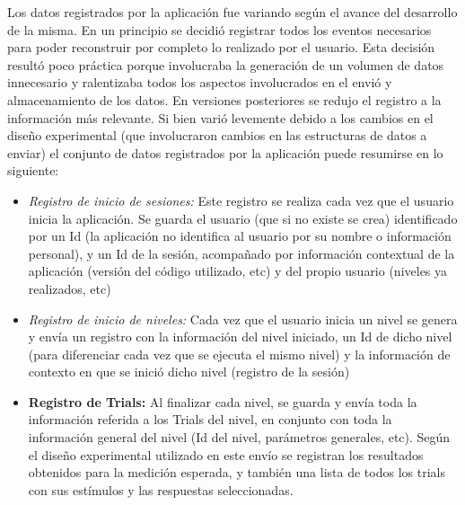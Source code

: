 \documentclass{article}
\numberwithin{figure}{section}
\begin{document}
    Los datos registrados por la aplicación fue variando según el avance del desarrollo de la misma. En un principio se decidió registrar todos los eventos necesarios para poder reconstruir por completo lo realizado por el usuario. Esta decisión resultó poco práctica porque involucraba la generación de un volumen de datos innecesario y ralentizaba todos los aspectos involucrados en el envió y almacenamiento de los datos. 
    En versiones posteriores se redujo el registro a la información más relevante. Si bien varió levemente debido a los cambios en el diseño experimental (que involucraron cambios en las estructuras de datos a enviar) el conjunto de datos registrados por la aplicación puede resumirse en lo siguiente:
    \begin{itemize}
        \item \textit{Registro de inicio de sesiones:} Este registro se realiza cada vez que el usuario inicia la aplicación. Se guarda el usuario (que si no existe se crea) identificado por un Id (la aplicación no identifica al usuario por su nombre o información personal), y un Id de la sesión, acompañado por información contextual de la aplicación (versión del código utilizado, etc) y del propio usuario (niveles ya realizados, etc)
        
        \item \textit{Registro de inicio de niveles:} Cada vez que el usuario inicia un nivel se genera y envía un registro con la información del nivel iniciado, un Id de dicho nivel (para diferenciar cada vez que se ejecuta el mismo nivel) y la información de contexto en que se inició dicho nivel (registro de la sesión)
        
        \item \textbf{Registro de Trials:} Al finalizar cada nivel, se guarda y envía toda la información referida a los Trials del nivel, en conjunto con toda la información general del nivel (Id del nivel, parámetros generales, etc). Según el diseño experimental utilizado en este envío se registran los resultados obtenidos para la medición esperada, y también una lista de todos los trials con sus estímulos y las respuestas seleccionadas. 
    \end{itemize}
    
\end{document}

